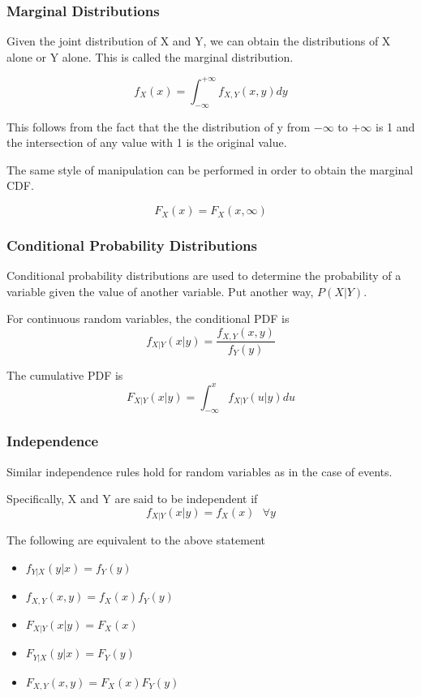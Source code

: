 \subsubsection*{Marginal Distributions}
Given the joint distribution of X and Y, we can obtain the distributions of X alone or Y alone. This is called the marginal distribution.

\[
    f_X(x) = \int_{-\infty}^{+\infty}f_{X, Y}(x, y)dy
\]

This follows from the fact that the the distribution of y from $-\infty$ to $+\infty$ is 1 and the intersection of any value with 1 is the original value. 

The same style of manipulation can be performed in order to obtain the marginal CDF.

\[
    F_X(x) = F_X(x, \infty)
\]

\subsubsection*{Conditional Probability Distributions}
Conditional probability distributions are used to determine the probability of a variable given the value of another variable. Put another way, $P(X | Y)$.

For continuous random variables, the conditional PDF is
\[
    f_{X|Y}(x|y) = \frac{f_{X,Y}(x, y)}{f_Y(y)}
\]

The cumulative PDF is
\[
    F_{X|Y}(x|y) = \int_{-\infty}^{x}f_{X|Y}(u|y)du
\]

\subsubsection*{Independence}
Similar independence rules hold for random variables as in the case of events.

Specifically, X and Y are said to be independent if
\[
    f_{X|Y}(x| y) = f_X(x) \text{   }\forall y
\]

The following are equivalent to the above statement
\begin{itemize}
    \item $f_{Y|X}(y|x) = f_Y(y)$
    \item $f_{X,Y}(x, y) = f_X(x)f_Y(y)$
    \item $F_{X|Y}(x| y) = F_X(x) $
    \item $F_{Y|X}(y|x) = F_Y(y)$
    \item $F_{X,Y}(x, y) = F_X(x)F_Y(y)$
\end{itemize}

